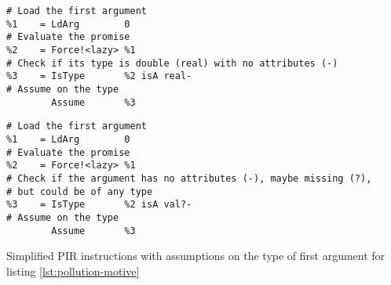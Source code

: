 \begin{listing}
	\begin{sublisting}{\textwidth}
		\begin{verbatim}
# Load the first argument
%1    = LdArg        0
# Evaluate the promise
%2    = Force!<lazy> %1
# Check if its type is double (real) with no attributes (-)
%3    = IsType       %2 isA real-
# Assume on the type
        Assume       %3
    \end{verbatim}
		\label{lst:pollution-pir-real}
	\end{sublisting}

	\vspace{1em}

	\begin{sublisting}{\textwidth}
		\begin{verbatim}
# Load the first argument
%1    = LdArg        0
# Evaluate the promise
%2    = Force!<lazy> %1
# Check if the argument has no attributes (-), maybe missing (?),
# but could be of any type
%3    = IsType       %2 isA val?-
# Assume on the type
        Assume       %3
    \end{verbatim}
		\label{lst:pollution-pir-val}
	\end{sublisting}
	\caption{Simplified PIR instructions with assumptions on the type of first argument for listing \ref{lst:pollution-motive}}
\end{listing}

